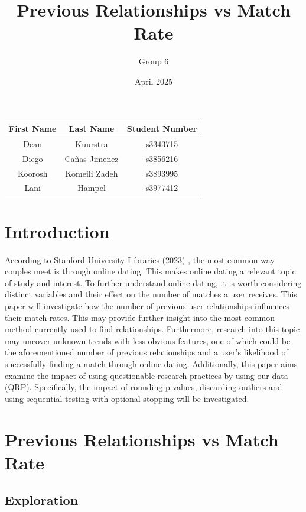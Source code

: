 \documentclass{article}
\title{Previous Relationships vs Match Rate}
\author{Group 6}
\date{April 2025}
\begin{document}
\maketitle

\begin{table}[ht]
    \centering
    \begin{tabular}{ccc} 
    \toprule
    \textbf{First Name} & \textbf{Last Name} & \textbf{Student Number} \\ 
    \midrule
    Dean & Kuurstra    & s3343715 \\ 
    Diego & Cañas Jimenez & s3856216 \\
    Koorosh & Komeili Zadeh & s3893995 \\ 
    Lani & Hampel & s3977412 \\ 
    \bottomrule
    \end{tabular}
    \label{tab:group6_members}
\end{table}

\section{Introduction}

According to Stanford University Libraries (2023) \cite{rosenfeld2023}, the most common way couples meet is through online dating. This makes online dating a relevant topic of study and interest. To further understand online dating, it is worth considering distinct variables and their effect on the number of matches a user receives. This paper will investigate how the number of previous user relationships influences their match rates. This may provide further insight into the most common method currently used to find relationships. Furthermore, research into this topic may uncover unknown trends with less obvious features, one of which could be the aforementioned number of previous relationships and a user’s likelihood of successfully finding a match through online dating. Additionally, this paper aims examine the impact of using questionable research practices by using our data (QRP). Specifically, the impact of rounding p-values, discarding outliers and using sequential testing with optional stopping will be investigated.


\section{Previous Relationships vs Match Rate}

\subsection{Exploration}
\end{document}
